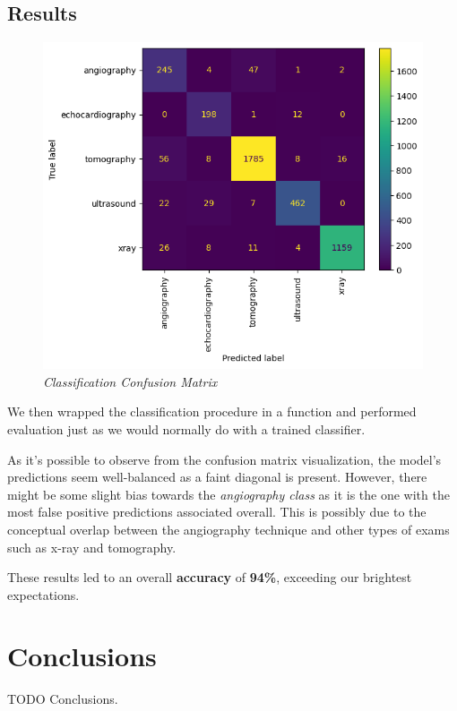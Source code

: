 \documentclass[10pt,twocolumn,letterpaper]{article}
\begin{document}
\subsection{Results}

\begin{figure}[H]
   \centering
   \includegraphics[width=1\linewidth]{img/Classification_Result.png}
   \caption{\textit{Classification Confusion Matrix}}
\end{figure}

We then wrapped the classification procedure in a function and performed evaluation just as we would normally do with a trained classifier.

As it's possible to observe from the confusion matrix visualization, the model's predictions seem well-balanced as a faint diagonal is present.
However, there might be some slight bias towards the \textit{angiography class} as it is the one with the most false positive predictions associated overall.
This is possibly due to the conceptual overlap between the angiography technique and other types of exams such as x-ray and tomography.

These results led to an overall \textbf{accuracy} of \textbf{94\%}, exceeding our brightest expectations.


\section{Conclusions}
TODO Conclusions.\cite{steinhardt, lipton}


{\small


}
\end{document}
